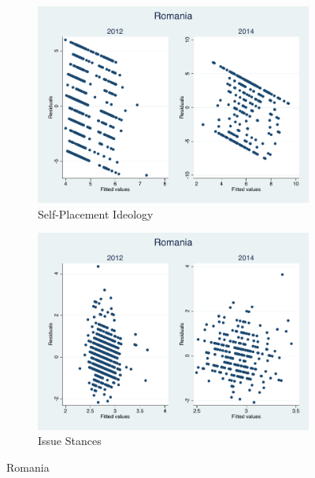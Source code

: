 \documentclass[12pt, titlepage]{article}
\begin{document}
\begin{figure}[H]
	\centering
	\begin{subfigure}[b]{0.475\textwidth}   
		\centering 
		\includegraphics[width=\textwidth]{Residuals/CountryIdeo/Romania}
		\caption{Self-Placement Ideology}
	\end{subfigure}
	\hfill
	\begin{subfigure}[b]{0.475\textwidth}
		\centering 
		\includegraphics[width=\textwidth]{Residuals/CountryLib/Romania}
		\caption{Issue Stances}
	\end{subfigure}
	\caption{Romania}
	\label{Romania}
\end{figure}
\end{document}
